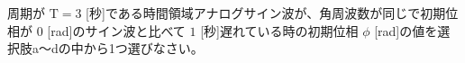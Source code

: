 周期が $\textrm{T}=3$ [秒]である時間領域アナログサイン波が、角周波数が同じで初期位相が $0$ [rad]のサイン波と比べて $1$ [秒]遅れている時の初期位相 $\phi$ [rad]の値を選択肢a〜dの中から1つ選びなさい。
